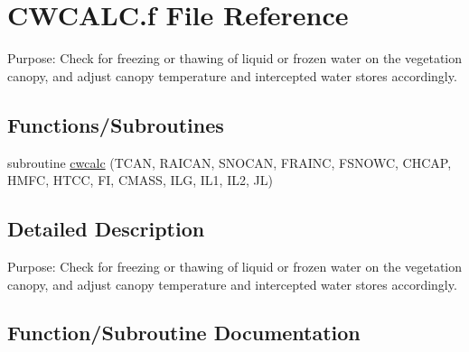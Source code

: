 \hypertarget{CWCALC_8f}{}\section{C\+W\+C\+A\+L\+C.\+f File Reference}
\label{CWCALC_8f}


Purpose\+: Check for freezing or thawing of liquid or frozen water on the vegetation canopy, and adjust canopy temperature and intercepted water stores accordingly.  


\subsection*{Functions/\+Subroutines}
\begin{DoxyCompactItemize}
\item 
subroutine \hyperlink{CWCALC_8f_a1c51886dfe7782b7a65415cc66561efb}{cwcalc} (T\+C\+A\+N, R\+A\+I\+C\+A\+N, S\+N\+O\+C\+A\+N, F\+R\+A\+I\+N\+C, F\+S\+N\+O\+W\+C, C\+H\+C\+A\+P, H\+M\+F\+C, H\+T\+C\+C, F\+I, C\+M\+A\+S\+S, I\+L\+G, I\+L1, I\+L2, J\+L)
\end{DoxyCompactItemize}


\subsection{Detailed Description}
Purpose\+: Check for freezing or thawing of liquid or frozen water on the vegetation canopy, and adjust canopy temperature and intercepted water stores accordingly. 



\subsection{Function/\+Subroutine Documentation}
\hypertarget{CWCALC_8f_a1c51886dfe7782b7a65415cc66561efb}{}
